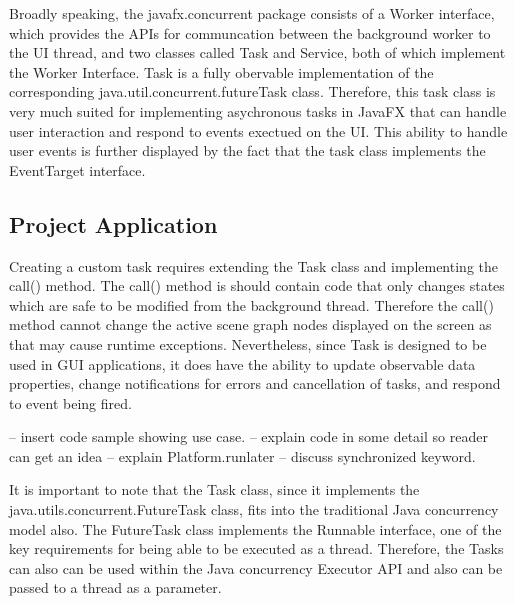 Broadly speaking, the javafx.concurrent package consists of a Worker interface, which provides the APIs for communcation between the background worker to the UI thread, and two classes called Task and Service, both of which implement the Worker Interface. Task is a fully obervable implementation of the corresponding java.util.concurrent.futureTask class. Therefore, this task class is very much suited for implementing asychronous tasks in JavaFX that can handle user interaction and respond to events exectued on the UI. This ability to handle user events is further displayed by the fact that the task class implements the EventTarget interface. 

\subsection{Project Application}
%
Creating a custom task requires extending the Task class and implementing the call() method. The call() method is should contain code that only changes states which are safe to be modified from the background thread. Therefore the call() method cannot change the active scene graph nodes displayed on the screen as that may cause runtime exceptions. Nevertheless, since Task is designed to be used in GUI applications, it does have the ability to update observable data properties, change notifications for errors and cancellation of tasks, and respond to event being fired.

-- insert code sample showing use case. 
-- explain code in some detail so reader can get an idea
-- explain Platform.runlater
-- discuss synchronized keyword. 

It is important to note that the Task class, since it implements the java.utils.concurrent.FutureTask class, fits into the traditional Java concurrency model also. The FutureTask class implements the Runnable interface, one of the key requirements for being able to be executed as a thread. Therefore, the Tasks can also can be used within the Java concurrency Executor API and also can be passed to a thread as a parameter.

